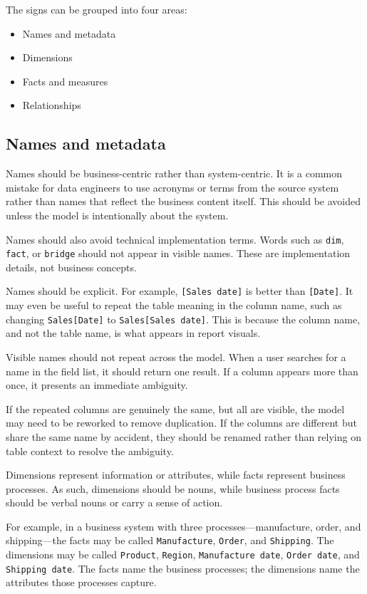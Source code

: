 \documentclass[10pt,openany,10pt]{book}
\providecommand{\tightlist}{%
  \setlength{\itemsep}{0pt}\setlength{\parskip}{0pt}}
\begin{document}
The signs can be grouped into four areas:

\begin{itemize}
\tightlist
\item
  Names and metadata
\item
  Dimensions
\item
  Facts and measures
\item
  Relationships
\end{itemize}

\subsection{Names and metadata}\label{names-and-metadata}

Names should be business-centric rather than system-centric. It is a
common mistake for data engineers to use acronyms or terms from the
source system rather than names that reflect the business content
itself. This should be avoided unless the model is intentionally about
the system.

Names should also avoid technical implementation terms. Words such as
\texttt{dim}, \texttt{fact}, or \texttt{bridge} should not appear in
visible names. These are implementation details, not business concepts.

Names should be explicit. For example, \texttt{{[}Sales\ date{]}} is
better than \texttt{{[}Date{]}}. It may even be useful to repeat the
table meaning in the column name, such as changing
\texttt{Sales{[}Date{]}} to \texttt{Sales{[}Sales\ date{]}}. This is
because the column name, and not the table name, is what appears in
report visuals.

Visible names should not repeat across the model. When a user searches
for a name in the field list, it should return one result. If a column
appears more than once, it presents an immediate ambiguity.

If the repeated columns are genuinely the same, but all are visible, the
model may need to be reworked to remove duplication. If the columns are
different but share the same name by accident, they should be renamed
rather than relying on table context to resolve the ambiguity.

Dimensions represent information or attributes, while facts represent
business processes. As such, dimensions should be nouns, while business
process facts should be verbal nouns or carry a sense of action.

For example, in a business system with three processes---manufacture,
order, and shipping---the facts may be called \texttt{Manufacture},
\texttt{Order}, and \texttt{Shipping}. The dimensions may be called
\texttt{Product}, \texttt{Region}, \texttt{Manufacture\ date},
\texttt{Order\ date}, and \texttt{Shipping\ date}. The facts name the
business processes; the dimensions name the attributes those processes
capture.
\end{document}
